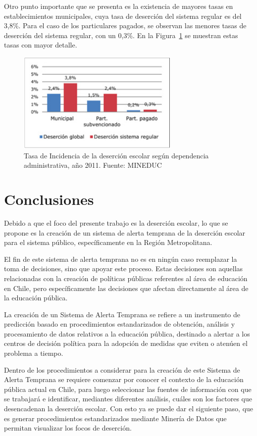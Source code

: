 Otro punto importante que se presenta es la existencia de mayores tasas en establecimientos municipales, cuya tasa de deserción del sistema regular es del 3,8\%. Para el caso de los particulares pagados, se observan las menores tasas de deserción del sistema regular, con un 0,3\%. En la Figura~\ref{fig:admin} se muestran estas tasas con mayor detalle.

\begin{figure}[H]
  \centering
    \includegraphics[width=0.7\textwidth]{Figuras/desercionadmin}
      \caption{Tasa de Incidencia de la deserción escolar según dependencia administrativa, año 2011. Fuente: MINEDUC}
    \label{fig:admin}
\end{figure}

\section{Conclusiones}

Debido a que el foco del presente trabajo es la deserción escolar, lo que se propone es la creación de un sistema de alerta temprana de la deserción escolar para el sistema público, específicamente en la Región Metropolitana. 

El fin de este sistema de alerta temprana no es en ningún caso reemplazar la toma de decisiones, sino que apoyar este proceso. Estas decisiones son aquellas relacionadas con la creación de políticas públicas referentes al área de educación en Chile, pero específicamente las decisiones que afectan directamente al área de la educación pública. 

La creación de un Sistema de Alerta Temprana se refiere a un instrumento de predicción basado en procedimientos estandarizados de obtención, análisis y procesamiento de datos relativos a la educación pública, destinado a alertar a los centros de decisión política para la adopción de medidas que eviten o atenúen el problema a tiempo. 

Dentro de los procedimientos a considerar para la creación de este Sistema de Alerta Temprana se requiere comenzar por conocer el contexto de la educación pública actual en Chile, para luego seleccionar las fuentes de información con que se trabajará e identificar, mediantes diferentes análisis, cuáles son los factores que desencadenan la deserción escolar. Con esto ya se puede dar el siguiente paso, que es generar procedimientos estandarizados mediante Minería de Datos que permitan visualizar los focos de deserción.